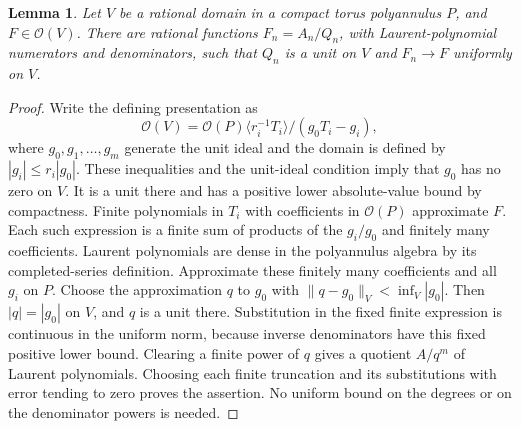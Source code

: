 \documentclass[11pt]{article}
\newtheorem{lemma}[theorem]{Lemma}
\begin{document}
\begin{lemma}\label{rational}
Let $V$ be a rational domain in a compact torus polyannulus $P$, and
$F\in\mathcal O(V)$. There are rational functions
$F_n=A_n/Q_n$, with Laurent-polynomial numerators and denominators,
such that $Q_n$ is a unit on $V$ and $F_n\to F$ uniformly on $V$.
\end{lemma}
\begin{proof}
Write the defining presentation as
\[
 \mathcal O(V)=\mathcal O(P)\langle r_i^{-1}T_i\rangle/
                    (g_0T_i-g_i),
\]
where $g_0,g_1,\ldots,g_m$ generate the unit ideal and the domain is
defined by $|g_i|\le r_i|g_0|$. These inequalities and the unit-ideal
condition imply that $g_0$ has no zero on $V$. It is a unit there and
has a positive lower absolute-value bound by compactness.
Finite polynomials in $T_i$ with coefficients in $\mathcal O(P)$
approximate $F$. Each such expression is a finite sum of products of
the $g_i/g_0$ and finitely many coefficients. Laurent polynomials are
dense in the polyannulus algebra by its completed-series definition.
Approximate these finitely many coefficients and all $g_i$ on $P$.
Choose the approximation $q$ to $g_0$ with
$\|q-g_0\|_V<\inf_V|g_0|$. Then $|q|=|g_0|$ on $V$, and $q$ is a
unit there. Substitution in the fixed finite expression is continuous
in the uniform norm, because inverse denominators have this fixed
positive lower bound. Clearing a finite power of $q$ gives a quotient
$A/q^m$ of Laurent polynomials. Choosing each finite truncation and
its substitutions with error tending to zero proves the assertion.
No uniform bound on the degrees or on the denominator powers is needed.
\end{proof}
\end{document}
